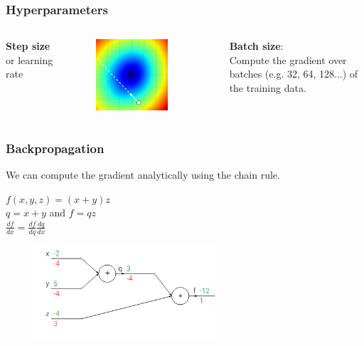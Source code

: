\begin{frame}
	\frametitle{Hyperparameters}

	\begin{columns}
		\textbf{Step size} or learning rate
		\centering
		\begin{figure}
                	\includegraphics[width=0.8\textwidth]{Pics/stepsize.jpg}
        	\end{figure}
		\textbf{Batch size}:\\
		Compute the gradient over batches (e.g. 32, 64, 128...) of the 
		training data.
	\end{columns}

\end{frame}

\begin{frame}
	\frametitle{Backpropagation}

	We can compute the gradient analytically using the chain rule.

	\vskip 0.5cm

	\centering
	$f(x,y,z)=(x+y)z$\\
	$q=x+y$ and $f=qz$\\
	$\frac{df}{dx}=\frac{df}{dq}\frac{dq}{dx}$

        \begin{figure}
                \includegraphics[width=0.6\textwidth]{Pics/backpropagation}
        \end{figure}

\end{frame}


